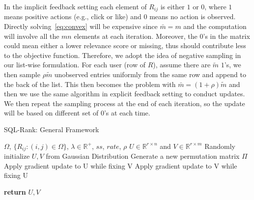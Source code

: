\documentclass{article}
\def\R{\mathbb{R}}
\def\R{\mathbb{R}}
\begin{document}
In the implicit feedback setting each element of $R_{ij}$ is either $1$ or $0$, where $1$ means positive actions (e.g., click or like) and $0$ means no action is observed.
Directly solving~\eqref{eq:convex} will be expensive since $\bar{m}=m$ and the computation
will involve all the $mn$ elements at each iteration. Moreover, the $0$'s in the matrix 
could mean either a lower relevance score or missing, thus should contribute less to the objective function. 
Therefore, we adopt the idea of negative sampling \cite{mikolov2013distributed} in our list-wise formulation. 
For each user (row of $R$), assume there are $\tilde{m}$ $1$'s, we then 
sample $\rho \tilde{m}$ unobserved entries uniformly from the same row and append to the back of the list. This then becomes the problem with $\bar{m}=(1+\rho) \tilde{m}$ and then we use the same algorithm
in explicit feedback setting to conduct updates. 
We then repeat the sampling process at the end of each iteration, so the update will be based on different set of $0$'s at each time. 

\begin{algorithm}[tb]
   \caption{SQL-Rank: General Framework}
   \label{alg:sqlrank}
\begin{algorithmic}
    $\Omega$, $\{R_{ij}: (i, j) \in \Omega \}$, $\lambda\in \R^+$, $ss$, $rate$, $\rho$
    $U\in \R^{r \times n}$ and $V \in \R^{r \times m}$
   \STATE Randomly initialize $U, V$ from Gaussian Distribution
   \REPEAT
   \STATE Generate a new permutation matrix $\Pi$  
   \STATE Apply gradient update to U while fixing V 
   \STATE Apply gradient update to V while fixing U 
   
   \STATE \textbf{return} $U, V$
\end{algorithmic}
\end{algorithm}
\end{document}
